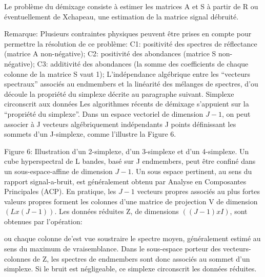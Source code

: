    

Le problème du démixage consiste à estimer les matrices A et S à
partir de R ou éventuellement de Xchapeau, une estimation de la matrice signal
débruité.

Remarque: Plusieurs contraintes physiques peuvent être prises en
compte pour permettre la résolution de ce problème: 
C1: positivité
des spectres de réflectance (matrice A non-négative); 
C2: positivité
des abondances (matrice S non-négative); 
C3: additivité des
abondances (la somme des coefficients de chaque colonne de la matrice
S vaut 1); 
L'indépendance algébrique entre les ``vecteurs spectraux''
associés au endmembers et la linéarité des mélanges de spectres, d'ou
découle la propriété du simplexe décrite au paragraphe suivant.
Simplexe circonscrit aux données Les algorithmes récents de démixage
s'appuient sur la ``propriété du simplexe''. Dans un espace vectoriel
de dimension $J-1$, on peut associer à J vecteurs algébriquement
indépendants J points définissant les sommets d'un J-simplexe, comme
l'illustre la Figure 6.

Figure 6: Illustration d'un 2-simplexe, d'un 3-simplexe et d'un
4-simplexe.  Un cube hyperspectral de L bandes, basé sur J endmembers,
peut être confiné dans un sous-espace-affine de dimension $J-1$.  Un
sous espace pertinent, au sens du rapport signal-a-bruit, est
généralement obtenu par Analyse en Composantes Principales (ACP). En
pratique, les $J-1$ vecteurs propres associés au plus fortes valeurs
propres forment les colonnes d'une matrice de projection V de
dimension $(Lx(J-1))$. Les données réduites Z, de dimensions $((J-1)xI)$,
sont obtenues par l'opération:

ou chaque colonne de'est vue soustraire le spectre moyen,
généralement estimé au sens du maximum de vraisemblance. Dans le
sous-espace porteur des vecteurs-colonnes de Z, les spectres de
endmembers sont donc associés au sommet d'un simplexe. Si le bruit est
négligeable, ce simplexe circonscrit les données réduites.


